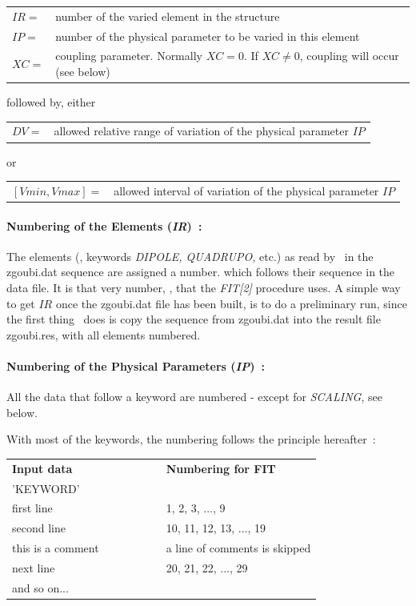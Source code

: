 \begin{tabular}{ll}
$ IR = $ &number of the varied element in the structure \\
$ IP =  $ &number of the physical parameter to be varied in this element \\
$ XC =  $ &coupling parameter. Normally $ XC=0$.  If $ XC\not= 0$, coupling will occur (see below) \\
\end{tabular} 

\noindent followed by, either 

\begin{tabular}{ll}
$ DV = $ &allowed relative range of variation of the physical parameter $ IP $
\end{tabular}

\noindent or 

\begin{tabular}{ll}
$ [Vmin,Vmax] = $ &allowed interval of variation of the physical parameter $ IP $
\end{tabular}



\paragraph{Numbering of the Elements (\textsl{IR})~: } 

\noindent The elements (\ie, keywords \textsl{DIPOLE, QUADRUPO,} etc.) 
as read by \zgoubi\ in the zgoubi.dat sequence are assigned a number.  which follows 
 their sequence in the  data file.  It  is that very number, \IR, that 
the \textsl{FIT[2]} procedure uses. 
A simple way to get $ IR $ once the zgoubi.dat file has been built, is to do a preliminary run, 
since the first thing  \zgou\ does is 
copy the sequence from zgoubi.dat  into the result file  zgoubi.res,  with all elements numbered.  

\paragraph{Numbering of the Physical Parameters (\textsl{IP})~: }

\noindent All the data that follow a keyword are numbered -  except for \textsl{SCALING}, see below. 

\noindent With most of the keywords, the numbering follows the principle hereafter~: 
\begin{center}
{\renewcommand{\arraystretch}{1}
	\begin{tabular}{lcl}
	\textbf{Input  data}  &~~~~~~~~&  \textbf{Numbering  for  FIT}\\
	'KEYWORD'      &&  \\
	first line   && 1, 2, 3, ..., 9 \\
	second  line &&  10, 11, 12, 13, ..., 19 \\
	this  is  a  comment &&  a line of comments is skipped\\
	next line    && 20, 21, 22, ..., 29  \\
	and  so  on... && 
	\end{tabular}    }
\end{center}

